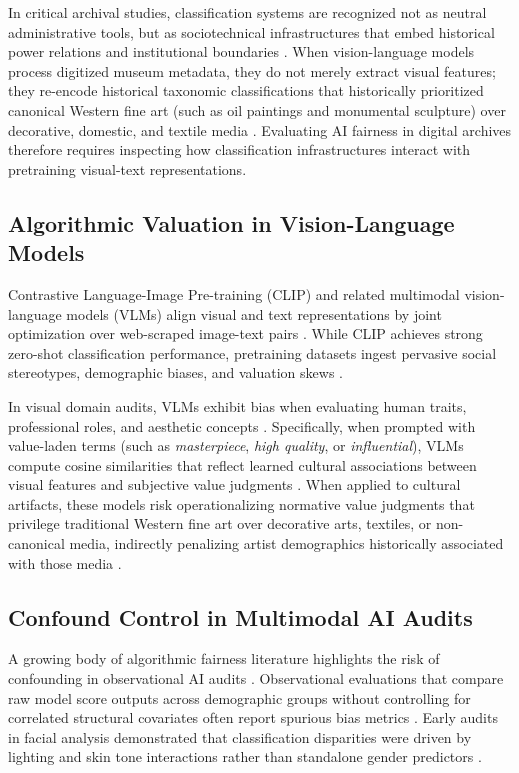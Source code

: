 \documentclass[pdflatex,sn-mathphys-num]{sn-jnl}%
\theoremstyle{thmstyleone}%
\theoremstyle{thmstyletwo}%
\theoremstyle{thmstylethree}%
\begin{document}
In critical archival studies, classification systems are recognized not as neutral administrative tools, but as sociotechnical infrastructures that embed historical power relations and institutional boundaries \cite{bowker2000sorting, noble2018algorithms, caswell2017archival}. When vision-language models process digitized museum metadata, they do not merely extract visual features; they re-encode historical taxonomic classifications that historically prioritized canonical Western fine art (such as oil paintings and monumental sculpture) over decorative, domestic, and textile media \cite{bailey2020gender, bowker2000sorting}. Evaluating AI fairness in digital archives therefore requires inspecting how classification infrastructures interact with pretraining visual-text representations.

\subsection{Algorithmic Valuation in Vision-Language Models}
Contrastive Language-Image Pre-training (CLIP) \cite{radford2021learning} and related multimodal vision-language models (VLMs) align visual and text representations by joint optimization over web-scraped image-text pairs \cite{he2016deep, dosovitskiy2020image}. While CLIP achieves strong zero-shot classification performance, pretraining datasets ingest pervasive social stereotypes, demographic biases, and valuation skews \cite{birhane2021multimodal, wolfe2022evidence, bender2021stochastic, steed2021image}.

In visual domain audits, VLMs exhibit bias when evaluating human traits, professional roles, and aesthetic concepts \cite{hall2023auditing, wang2022revisiting, luccioni2023stable}. Specifically, when prompted with value-laden terms (such as \textit{masterpiece}, \textit{high quality}, or \textit{influential}), VLMs compute cosine similarities that reflect learned cultural associations between visual features and subjective value judgments \cite{garcia2020bias, bianchi2023easily}. When applied to cultural artifacts, these models risk operationalizing normative value judgments that privilege traditional Western fine art over decorative arts, textiles, or non-canonical media, indirectly penalizing artist demographics historically associated with those media \cite{wolfe2022evidence, zhao2017men}.

\subsection{Confound Control in Multimodal AI Audits}
A growing body of algorithmic fairness literature highlights the risk of confounding in observational AI audits \cite{buolamwini2018gender, mitchell2019model, bolukbasi2016man}. Observational evaluations that compare raw model score outputs across demographic groups without controlling for correlated structural covariates often report spurious bias metrics \cite{hall2023auditing}. Early audits in facial analysis demonstrated that classification disparities were driven by lighting and skin tone interactions rather than standalone gender predictors \cite{buolamwini2018gender}.
\end{document}
